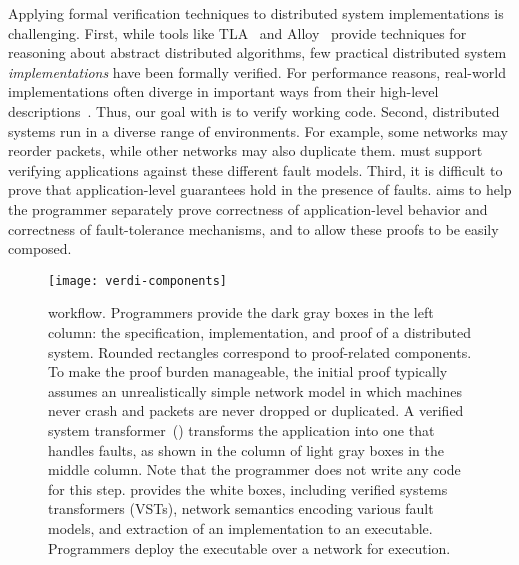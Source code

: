 Applying formal verification techniques to distributed system
implementations is challenging.
%
First, while tools like TLA~\cite{lamport:tla} and
Alloy~\cite{jackson:alloy} provide techniques for reasoning about
abstract distributed algorithms, few practical distributed
system \textit{implementations}
have been formally verified.
%
For performance reasons, real-world implementations often diverge
in important ways from their high-level
descriptions~\cite{chandra:paxos-made-live}.
Thus, our goal with \Verdi is to verify working code.
%
Second, distributed systems run in a diverse range of environments. For
example, some networks may reorder packets, while other networks may also
duplicate them. \Verdi must support verifying applications against these
different fault models.
%
Third, it is difficult to prove that application-level guarantees hold in
the presence of faults. \Verdi aims to help the programmer separately prove
correctness of application-level behavior and correctness of
fault-tolerance mechanisms, and to allow these proofs to be easily composed.

\begin{figure*}
\texttt{[image: verdi-components]}

\caption{\Verdi workflow.  Programmers provide the dark gray boxes in
  the left column: the specification, implementation, and proof of a
  distributed system.  Rounded rectangles correspond to proof-related
  components.  To make the proof burden manageable, the initial proof
  typically assumes an unrealistically simple network model in which
  machines never crash and packets are never dropped or duplicated.  A
  verified system transformer~(\VST) transforms the application into
  one that handles faults, as shown in the column of light gray boxes
  in the middle column.  Note that the programmer does not write any
  code for this step. \Verdi provides the white boxes, including
  verified systems transformers (VSTs), network semantics encoding
  various fault models, and extraction of an implementation to an
  executable.  Programmers deploy the executable over a network for
  execution.}


\label{fig:verdi-components}
\end{figure*}

